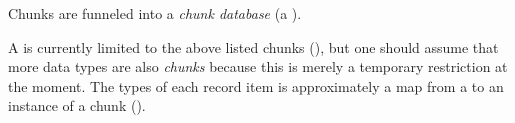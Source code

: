 
Chunks are funneled into a \textit{chunk database} (a \ChunkDB{}).

\originalChunkDBHaskell{}

A \ChunkDB{} is currently limited to the above listed chunks
(), but one should assume that more data types are
also \textit{chunks} because this is merely a temporary restriction at the
moment. The types of each record item is approximately a map from a \UID{} to an
instance of a chunk ().
